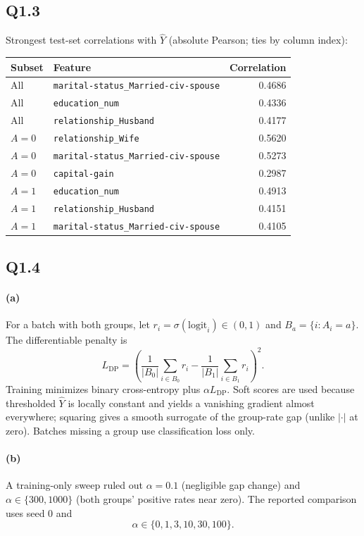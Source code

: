 \documentclass[11pt]{article}
\newcommand{\Yhat}{\widehat Y}
\begin{document}
\subsection*{Q1.3}
Strongest test-set correlations with $\Yhat$ (absolute Pearson; ties by column index):

\begin{center}
\small
\begin{tabular}{llr}
\toprule
Subset & Feature & Correlation \\
\midrule
All & \texttt{marital-status\_Married-civ-spouse} & 0.4686 \\
All & \texttt{education\_num} & 0.4336 \\
All & \texttt{relationship\_Husband} & 0.4177 \\
$A=0$ & \texttt{relationship\_Wife} & 0.5620 \\
$A=0$ & \texttt{marital-status\_Married-civ-spouse} & 0.5273 \\
$A=0$ & \texttt{capital-gain} & 0.2987 \\
$A=1$ & \texttt{education\_num} & 0.4913 \\
$A=1$ & \texttt{relationship\_Husband} & 0.4151 \\
$A=1$ & \texttt{marital-status\_Married-civ-spouse} & 0.4105 \\
\bottomrule
\end{tabular}
\end{center}

\subsection*{Q1.4}
\paragraph{(a)}
For a batch with both groups, let $r_i=\sigma(\mathrm{logit}_i)\in(0,1)$ and $B_a=\{i:A_i=a\}$. The differentiable penalty is
\[
L_{\mathrm{DP}}
=
\left(
\frac1{|B_0|}\sum_{i\in B_0} r_i
-
\frac1{|B_1|}\sum_{i\in B_1} r_i
\right)^2.
\]
Training minimizes binary cross-entropy plus $\alpha L_{\mathrm{DP}}$. Soft scores are used because thresholded $\Yhat$ is locally constant and yields a vanishing gradient almost everywhere; squaring gives a smooth surrogate of the group-rate gap (unlike $|\cdot|$ at zero). Batches missing a group use classification loss only.

\paragraph{(b)}
A training-only sweep ruled out $\alpha=0.1$ (negligible gap change) and $\alpha\in\{300,1000\}$ (both groups' positive rates near zero). The reported comparison uses seed 0 and
\[
\alpha\in\{0,1,3,10,30,100\}.
\]
\end{document}
